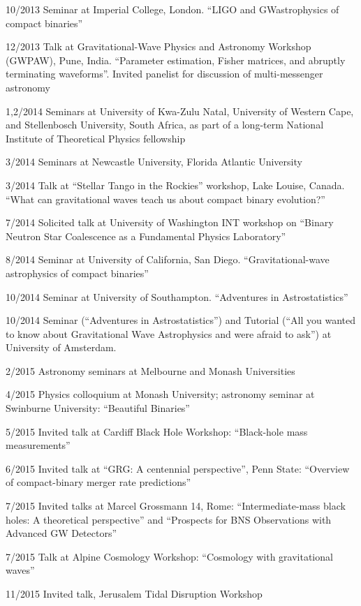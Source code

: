 \documentclass[margin,line]{res}
\begin{document}
\begin{resume}
10/2013 	Seminar at Imperial College, London. ``LIGO and GWastrophysics of compact binaries''

12/2013   Talk at Gravitational-Wave Physics and Astronomy Workshop (GWPAW), Pune, India.  ``Parameter estimation, Fisher matrices, and abruptly terminating waveforms''.  Invited panelist for discussion of multi-messenger astronomy

1,2/2014	Seminars at University of Kwa-Zulu Natal, University of Western Cape, and Stellenbosch University, South Africa, as part of a long-term National Institute of Theoretical Physics fellowship

3/2014	Seminars at Newcastle University, Florida Atlantic University

3/2014	Talk at ``Stellar Tango in the Rockies'' workshop, Lake Louise, Canada.  ``What can gravitational waves teach us about compact binary evolution?''

7/2014	Solicited talk at University of Washington INT workshop on ``Binary Neutron Star Coalescence as a Fundamental Physics Laboratory''

8/2014 	Seminar at University of California, San Diego.   ``Gravitational-wave astrophysics of compact binaries''

10/2014	Seminar at University of Southampton.  ``Adventures in Astrostatistics''

10/2014	Seminar (``Adventures in Astrostatistics'') and Tutorial (``All you wanted to know about Gravitational Wave Astrophysics and were afraid to ask'') at University of Amsterdam.  

2/2015	Astronomy seminars at Melbourne and Monash Universities

4/2015 	Physics colloquium at Monash University; astronomy seminar at Swinburne University:  ``Beautiful Binaries''

5/2015	Invited talk at Cardiff Black Hole Workshop: ``Black-hole mass measurements''

6/2015	Invited talk at ``GRG: A centennial perspective'', Penn State: ``Overview of compact-binary merger rate predictions''

7/2015	Invited talks at Marcel Grossmann 14, Rome: ``Intermediate-mass black holes: A theoretical perspective'' and ``Prospects for BNS Observations with Advanced GW Detectors''

7/2015	Talk at Alpine Cosmology Workshop: ``Cosmology with gravitational waves''

11/2015	Invited talk, Jerusalem Tidal Disruption Workshop


\end{resume}
\end{document}
